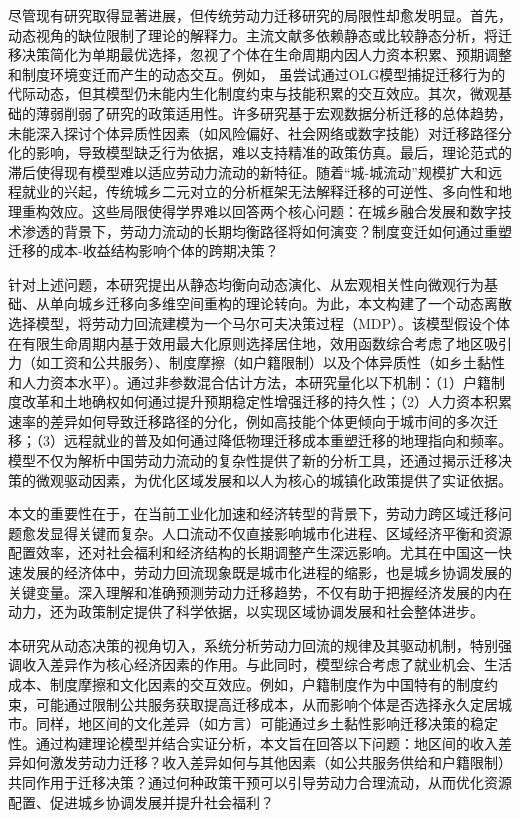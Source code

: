 \documentclass[a4paper, zihao=-4, fontset = mac, oneside]{ctexbook} %
\begin{document}
尽管现有研究取得显著进展，但传统劳动力迁移研究的局限性却愈发明显。首先，动态视角的缺位限制了理论的解释力。主流文献多依赖静态或比较静态分析，将迁移决策简化为单期最优选择，忽视了个体在生命周期内因人力资本积累、预期调整和制度环境变迁而产生的动态交互。例如，
\textcite{HanQiHengNongCunLaoDongLiQianYiMoCaYingXiangNongMinGongShuLiangYuGongZiJieGouMa2018}虽尝试通过OLG模型捕捉迁移行为的代际动态，但其模型仍未能内生化制度约束与技能积累的交互效应。其次，微观基础的薄弱削弱了研究的政策适用性。许多研究基于宏观数据分析迁移的总体趋势，未能深入探讨个体异质性因素（如风险偏好、社会网络或数字技能）对迁移路径分化的影响，导致模型缺乏行为依据，难以支持精准的政策仿真。最后，理论范式的滞后使得现有模型难以适应劳动力流动的新特征。随着“城-城流动”规模扩大和远程就业的兴起，传统城乡二元对立的分析框架无法解释迁移的可逆性、多向性和地理重构效应。这些局限使得学界难以回答两个核心问题：在城乡融合发展和数字技术渗透的背景下，劳动力流动的长期均衡路径将如何演变？制度变迁如何通过重塑迁移的成本-收益结构影响个体的跨期决策？

针对上述问题，本研究提出从静态均衡向动态演化、从宏观相关性向微观行为基础、从单向城乡迁移向多维空间重构的理论转向。为此，本文构建了一个动态离散选择模型，将劳动力回流建模为一个马尔可夫决策过程（MDP）。该模型假设个体在有限生命周期内基于效用最大化原则选择居住地，效用函数综合考虑了地区吸引力（如工资和公共服务）、制度摩擦（如户籍限制）以及个体异质性（如乡土黏性和人力资本水平）。通过非参数混合估计方法，本研究量化以下机制：（1）户籍制度改革和土地确权如何通过提升预期稳定性增强迁移的持久性；（2）人力资本积累速率的差异如何导致迁移路径的分化，例如高技能个体更倾向于城市间的多次迁移；（3）远程就业的普及如何通过降低物理迁移成本重塑迁移的地理指向和频率。模型不仅为解析中国劳动力流动的复杂性提供了新的分析工具，还通过揭示迁移决策的微观驱动因素，为优化区域发展和以人为核心的城镇化政策提供了实证依据。

本文的重要性在于，在当前工业化加速和经济转型的背景下，劳动力跨区域迁移问题愈发显得关键而复杂。人口流动不仅直接影响城市化进程、区域经济平衡和资源配置效率，还对社会福利和经济结构的长期调整产生深远影响。尤其在中国这一快速发展的经济体中，劳动力回流现象既是城市化进程的缩影，也是城乡协调发展的关键变量。深入理解和准确预测劳动力迁移趋势，不仅有助于把握经济发展的内在动力，还为政策制定提供了科学依据，以实现区域协调发展和社会整体进步。

本研究从动态决策的视角切入，系统分析劳动力回流的规律及其驱动机制，特别强调收入差异作为核心经济因素的作用。与此同时，模型综合考虑了就业机会、生活成本、制度摩擦和文化因素的交互效应。例如，户籍制度作为中国特有的制度约束，可能通过限制公共服务获取提高迁移成本，从而影响个体是否选择永久定居城市。同样，地区间的文化差异（如方言）可能通过乡土黏性影响迁移决策的稳定性。通过构建理论模型并结合实证分析，本文旨在回答以下问题：地区间的收入差异如何激发劳动力迁移？收入差异如何与其他因素（如公共服务供给和户籍限制）共同作用于迁移决策？通过何种政策干预可以引导劳动力合理流动，从而优化资源配置、促进城乡协调发展并提升社会福利？
\end{document}
